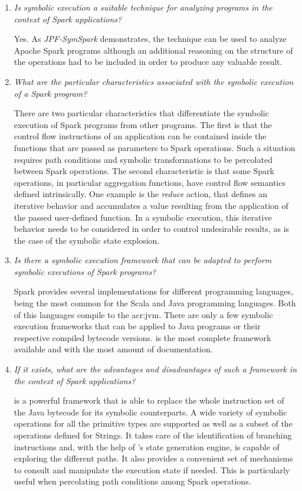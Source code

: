 \begin{enumerate}
	\item \textit{Is symbolic execution a suitable technique for analyzing programs in the context of Spark applications?} 
	
	Yes. As \textit{JPF-SymSpark} demonstrates, the technique can be used to analyze Apache Spark programs although an additional reasoning on the structure of the operations had to be included in order to produce any valuable result.
	
	\item \textit{What are the particular characteristics associated with the symbolic execution of a Spark program?}
	
	There are two particular characteristics that differentiate the symbolic execution of Spark programs from other programs. The first is that the control flow instructions of an application can be contained inside the functions that are passed as parameters to Spark operations. Such a situation requires path conditions and symbolic transformations to be percolated between Spark operations. The second characteristic is that some Spark operations, in particular aggregation functions, have control flow semantics defined intrinsically. One example is the \textit{reduce} action, that defines an iterative behavior and accumulates a value resulting from the application of the passed user-defined function. In a symbolic execution, this iterative behavior needs to be considered in order to control undesirable results, as is the case of the symbolic state explosion.
	
	\item \textit{Is there a symbolic execution framework that can be adapted to perform symbolic executions of Spark programs?}
	
	Spark provides several implementations for different programming languages, being the most common for the Scala and Java programming languages. Both of this languages compile to the \acrlong{acr:jvm}. There are only a few symbolic execution frameworks that can be applied to Java programs or their respective compiled bytecode versions. \spf{} is the most complete framework available and with the most amount of documentation.
	
	\item \textit{If it exists, what are the advantages and disadvantages of such a framework in the context of Spark applications?}
	
	\spf{} is a powerful framework that is able to replace the whole instruction set of the Java bytecode for its symbolic counterparts. A wide variety of symbolic operations for all the primitive types are supported as well as a subset of the operations defined for Strings. It takes care of the identification of branching instructions and, with the help of \jpf{}'s state generation engine, is capable of exploring the different paths. It also provides a convenient set of mechanisms to consult and manipulate the execution state if needed. This is particularly useful when percolating path conditions among Spark operations. 
	

\end{enumerate}
